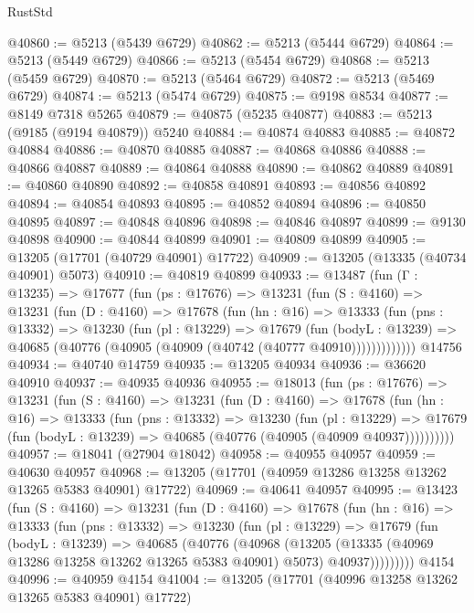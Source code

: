 \begin{lexlean}{RustStd}
\begin{coremodule}
@40860 := @5213 (@5439 @6729)
@40862 := @5213 (@5444 @6729)
@40864 := @5213 (@5449 @6729)
@40866 := @5213 (@5454 @6729)
@40868 := @5213 (@5459 @6729)
@40870 := @5213 (@5464 @6729)
@40872 := @5213 (@5469 @6729)
@40874 := @5213 (@5474 @6729)
@40875 := @9198 @8534
@40877 := @8149 @7318 @5265
@40879 := @40875 (@5235 @40877)
@40883 := @5213 (@9185 (@9194 @40879)) @5240
@40884 := @40874 @40883
@40885 := @40872 @40884
@40886 := @40870 @40885
@40887 := @40868 @40886
@40888 := @40866 @40887
@40889 := @40864 @40888
@40890 := @40862 @40889
@40891 := @40860 @40890
@40892 := @40858 @40891
@40893 := @40856 @40892
@40894 := @40854 @40893
@40895 := @40852 @40894
@40896 := @40850 @40895
@40897 := @40848 @40896
@40898 := @40846 @40897
@40899 := @9130 @40898
@40900 := @40844 @40899
@40901 := @40809 @40899
@40905 := @13205 (@17701 (@40729 @40901) @17722)
@40909 := @13205 (@13335 (@40734 @40901) @5073)
@40910 := @40819 @40899
@40933 := @13487
    (fun (Γ : @13235) =>
    @17677
      (fun (ps : @17676) =>
      @13231
        (fun (S : @4160) =>
        @13231
          (fun (D : @4160) =>
          @17678
            (fun (hn : @16) =>
            @13333
              (fun (pns : @13332) =>
              @13230
                (fun (pl : @13229) =>
                @17679
                  (fun (bodyL : @13239) =>
                  @40685 (@40776 (@40905 (@40909 (@40742 (@40777 @40910)))))))))))))
    @14756
@40934 := @40740 @14759
@40935 := @13205 @40934
@40936 := @36620 @40910
@40937 := @40935 @40936
@40955 := @18013
    (fun (ps : @17676) =>
    @13231
      (fun (S : @4160) =>
      @13231
        (fun (D : @4160) =>
        @17678
          (fun (hn : @16) =>
          @13333
            (fun (pns : @13332) =>
            @13230
              (fun (pl : @13229) =>
              @17679 (fun (bodyL : @13239) => @40685 (@40776 (@40905 (@40909 @40937))))))))))
@40957 := @18041 (@27904 @18042)
@40958 := @40955 @40957
@40959 := @40630 @40957
@40968 := @13205 (@17701 (@40959 @13286 @13258 @13262 @13265 @5383 @40901) @17722)
@40969 := @40641 @40957
@40995 := @13423
    (fun (S : @4160) =>
    @13231
      (fun (D : @4160) =>
      @17678
        (fun (hn : @16) =>
        @13333
          (fun (pns : @13332) =>
          @13230
            (fun (pl : @13229) =>
            @17679
              (fun (bodyL : @13239) =>
              @40685
                (@40776
                  (@40968
                    (@13205
                      (@13335 (@40969 @13286 @13258 @13262 @13265 @5383 @40901) @5073)
                      @40937)))))))))
    @4154
@40996 := @40959 @4154
@41004 := @13205 (@17701 (@40996 @13258 @13262 @13265 @5383 @40901) @17722)

\end{coremodule}
\end{lexlean}
